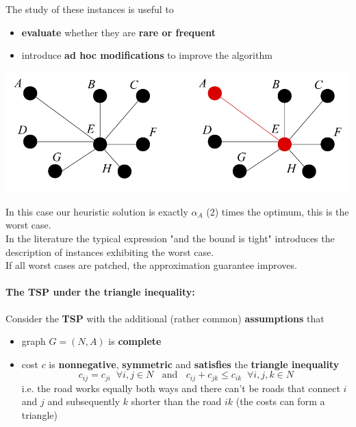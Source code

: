 The study of these instances is useful to
\begin{itemize}
	\item \textbf{evaluate} whether they are \textbf{rare or frequent}
	\item introduce \textbf{ad hoc modifications} to improve the algorithm
\end{itemize}
\begin{center}
	\includegraphics[width=0.8\columnwidth]{img/VCP2Approx2}
\end{center}
In this case our heuristic solution is exactly $\alpha_A$ (2) times the optimum, this is the worst case.\\

In the literature the typical expression "and the bound is tight" introduces the description of instances exhibiting the worst case.\\
If all worst cases are patched, the approximation guarantee improves.\\

\newpage

\paragraph{The TSP under the triangle inequality:} Consider the \textbf{TSP} with the additional (rather common) \textbf{assumptions} that
\begin{itemize}
	\item graph $G = (N, A)$ is \textbf{complete}
	\item cost $c$ is \textbf{nonnegative}, \textbf{symmetric} and \textbf{satisfies} the \textbf{triangle inequality}
	$$ c_{ij} = c_{ji} \;\; \forall i,j \in N \;\; \text{ and } \;\; c_{ij} + c_{jk} \leq c_{ik} \;\; \forall i,j,k \in N $$
	i.e. the road works equally both ways and there can't be roads that connect $i$ and $j$ and subsequently $k$ shorter than the road $ik$ (the costs can form a triangle)
\end{itemize}

